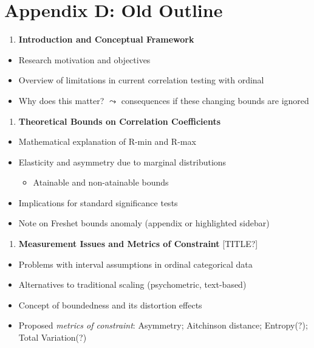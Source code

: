 \documentclass[
  12pt,
]{article}
\providecommand{\tightlist}{%
  \setlength{\itemsep}{0pt}\setlength{\parskip}{0pt}}
\theoremstyle{plain}
\theoremstyle{definition}
\theoremstyle{remark}
\begin{document}
\section{Appendix D: Old Outline}\label{appendix-d-old-outline}

\begin{enumerate}
\def\labelenumi{\arabic{enumi}.}
\tightlist
\item
  \textbf{Introduction and Conceptual Framework}
\end{enumerate}

\begin{itemize}
\tightlist
\item
  Research motivation and objectives
\item
  Overview of limitations in current correlation testing with ordinal
\item
  Why does this matter? \(\leadsto\) consequences if these changing
  bounds are ignored
\end{itemize}

\begin{enumerate}
\def\labelenumi{\arabic{enumi}.}
\setcounter{enumi}{1}
\tightlist
\item
  \textbf{Theoretical Bounds on Correlation Coefficients}
\end{enumerate}

\begin{itemize}
\tightlist
\item
  Mathematical explanation of R-min and R-max
\item
  Elasticity and asymmetry due to marginal distributions

  \begin{itemize}
  \tightlist
  \item
    Atainable and non-atainable bounds
  \end{itemize}
\item
  Implications for standard significance tests
\item
  Note on Freshet bounds anomaly (appendix or highlighted sidebar)
\end{itemize}

\begin{enumerate}
\def\labelenumi{\arabic{enumi}.}
\setcounter{enumi}{2}
\tightlist
\item
  \textbf{Measurement Issues and Metrics of Constraint} {[}TITLE?{]}
\end{enumerate}

\begin{itemize}
\tightlist
\item
  Problems with interval assumptions in ordinal categorical data
\item
  Alternatives to traditional scaling (psychometric, text-based)
\item
  Concept of boundedness and its distortion effects
\item
  Proposed \emph{metrics of constraint}: Asymmetry; Aitchinson distance;
  Entropy(?); Total Variation(?)
\end{itemize}
\end{document}
